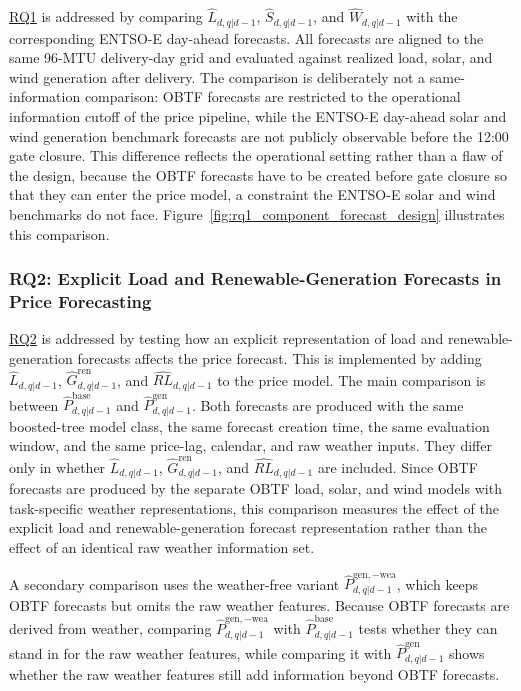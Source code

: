 \hyperlink{rq:component_forecast_quality}{RQ1} is addressed by comparing
\(\hat{L}_{d,q|d-1}\), \(\hat{S}_{d,q|d-1}\), and
\(\hat{W}_{d,q|d-1}\) with the corresponding \mbox{ENTSO-E} day-ahead
forecasts. All forecasts are aligned to the same 96-MTU delivery-day grid and
evaluated against realized load, solar, and wind generation after
delivery. The comparison is deliberately not a same-information comparison:
OBTF forecasts are restricted to the operational information cutoff
of the price pipeline, while the \mbox{ENTSO-E} day-ahead solar and wind
generation benchmark forecasts are not publicly observable before the
12:00 gate closure. This difference reflects the operational setting rather than a flaw of the
design, because the OBTF forecasts have to be created before gate
closure so that they can enter the price model, a constraint the \mbox{ENTSO-E}
solar and wind benchmarks do not face.
Figure~\ref{fig:rq1_component_forecast_design} illustrates this comparison.



\FloatBarrier

\subsubsection{RQ2: Explicit Load and Renewable-Generation Forecasts in Price Forecasting}
\label{sec:rq2_price_experiments}

\hyperlink{rq:price_impact_generated_forecasts}{RQ2} is addressed by testing
how an explicit representation of load and renewable-generation forecasts
affects the price forecast. This is implemented by adding
\(\hat{L}_{d,q|d-1}\),
\(\hat{G}^{\mathrm{ren}}_{d,q|d-1}\), and
\(\widehat{RL}_{d,q|d-1}\) to the price model. The main
comparison is between \(\hat{P}^{\mathrm{base}}_{d,q|d-1}\) and
\(\hat{P}^{\mathrm{gen}}_{d,q|d-1}\). Both forecasts are produced with the same
boosted-tree model class, the same forecast creation time, the same evaluation
window, and the same price-lag, calendar, and raw weather inputs.
They differ only in whether \(\hat{L}_{d,q|d-1}\),
\(\hat{G}^{\mathrm{ren}}_{d,q|d-1}\), and
\(\widehat{RL}_{d,q|d-1}\) are included.
Since OBTF forecasts are produced by the separate OBTF load, solar, and wind models with task-specific weather representations, this comparison measures
the effect of the explicit load and renewable-generation forecast
representation rather than the effect of an identical raw weather information
set.

A secondary comparison uses the weather-free variant
\(\hat{P}^{\mathrm{gen},-\mathrm{wea}}_{d,q|d-1}\), which keeps OBTF forecasts but omits the raw weather features. Because OBTF forecasts
are derived from weather, comparing
\(\hat{P}^{\mathrm{gen},-\mathrm{wea}}_{d,q|d-1}\) with
\(\hat{P}^{\mathrm{base}}_{d,q|d-1}\) tests whether they can stand in for the raw
weather features, while comparing it with
\(\hat{P}^{\mathrm{gen}}_{d,q|d-1}\) shows whether the raw weather features
still add information beyond OBTF forecasts.

